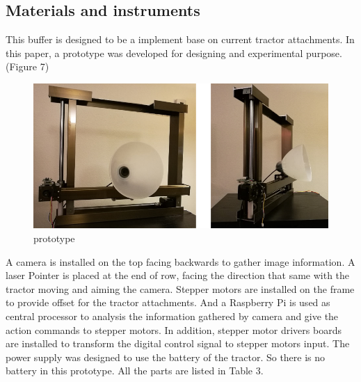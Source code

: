 \documentclass[12pt]{article}
\begin{document}
\begin{flushleft}
\subsection{Materials and instruments}
This buffer is designed to be a implement base on current tractor attachments. In this paper, a prototype was developed for designing and experimental purpose. (Figure 7) 
\begin{figure}[ht!]
	\begin{center}
		\includegraphics[scale = 0.6]{prototype.png}
		\caption{prototype}
	\end{center}
\end{figure}
A camera is installed on the top facing backwards to gather image information. A laser Pointer is placed at the end of row, facing the direction that same with the tractor moving and aiming the camera. Stepper motors are installed on the frame to provide offset for the tractor attachments. And a Raspberry Pi is used as central processor to analysis the information gathered by camera and give the action commands to stepper motors. In addition, stepper motor drivers boards are installed to transform the digital control signal to stepper motors input. The power supply was designed to use the battery of the tractor. So there is no battery in this prototype. All the parts are listed in Table 3.


\end{flushleft}
\end{document}
